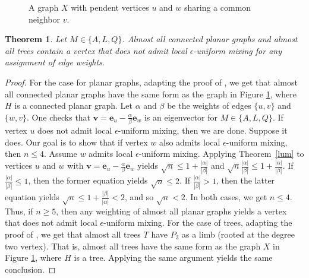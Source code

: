 \documentclass[11pt]{article}
\newtheorem{theorem}{Theorem}
\newcommand{\be}{\mathbf e}
\newcommand{\bv}{\mathbf v}
\begin{document}
\begin{figure}
\begin{center}
\end{center}
\caption{\label{fig1} A graph $X$ with pendent vertices $u$ and $w$ sharing a common neighbor $v$.}
\end{figure}

\begin{theorem}
\label{lumplntr}
Let $M\in\{A,L,Q\}$. Almost all connected planar graphs and almost all trees contain a vertex that does not admit local $\epsilon$-uniform mixing for any assignment of edge weights.
\end{theorem}

\begin{proof}
For the case for planar graphs, adapting the proof of \cite[Theorem 8]{godsil2025quantum}, we get that almost all connected planar graphs have the same form as the graph in Figure \ref{fig1}, where $H$ is a connected planar graph. Let $\alpha$ and $\beta$ be the weights of edges $\{u,v\}$ and $\{w,v\}$. One checks that $\bv=\be_u-\frac{\alpha}{\beta}\be_w$ is an eigenvector for $M\in\{A,L,Q\}$. If vertex $u$ does not admit local $\epsilon$-uniform mixing, then we are done. Suppose it does. Our goal is to show that if vertex $w$ also admits local $\epsilon$-uniform mixing, then $n\leq 4$. Assume $w$ admits local $\epsilon$-uniform mixing. Applying Theorem~\ref{lum} to vertices $u$ and $w$ with $\bv=\be_u-\frac{\alpha}{\beta}\be_w$ yields $\sqrt{n}\leq 1+\frac{|\alpha|}{|\beta|}$ and $\sqrt{n}\frac{|\alpha|}{|\beta|}\leq1+\frac{|\alpha|}{|\beta|}.$
If $\frac{|\alpha|}{|\beta|}\leq 1$, then the former equation yields $\sqrt{n}\leq 2$. If $\frac{|\alpha|}{|\beta|}>1$, then the latter equation yields $\sqrt{n}\leq 1+\frac{|\beta|}{|\alpha|}<2$, and so $\sqrt{n}<2$. In both cases, we get $n\leq 4$. Thus, if $n\geq 5$, then any weighting of almost all planar graphs yields a vertex that does not admit local $\epsilon$-uniform mixing. For the case of trees, adapting the proof of \cite[Theorem 9]{godsil2025quantum}, we get that almost all trees $T$ have $P_3$ as a limb (rooted at the degree two vertex). That is, almost all trees have the same form as the graph $X$ in Figure \ref{fig1}, where $H$ is a tree. Applying the same argument yields the same conclusion.
\end{proof}
\end{document}
